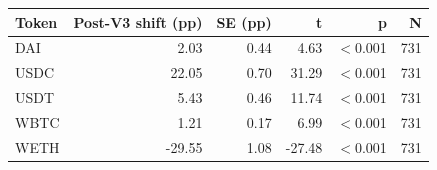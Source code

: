 \begin{tabular}{lrrrrr}
\toprule
Token & Post-V3 shift (pp) & SE (pp) & t & p & N \\
\midrule
DAI & 2.03 & 0.44 & 4.63 & \ensuremath{<}0.001 & 731 \\
USDC & 22.05 & 0.70 & 31.29 & \ensuremath{<}0.001 & 731 \\
USDT & 5.43 & 0.46 & 11.74 & \ensuremath{<}0.001 & 731 \\
WBTC & 1.21 & 0.17 & 6.99 & \ensuremath{<}0.001 & 731 \\
WETH & -29.55 & 1.08 & -27.48 & \ensuremath{<}0.001 & 731 \\
\bottomrule
\end{tabular}
